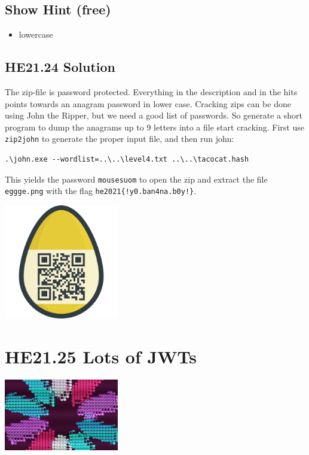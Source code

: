 \documentclass[english,a4paper,nols,noindent]{tufte-handout}
\begin{document}
\subsection{Show Hint (free)}
\begin{itemize}
\item lowercase
\end{itemize}

\hypertarget{he21.24-solution}{%
\subsection{HE21.24 Solution}\label{he21.24-solution}}

\noindent The zip-file is password protected.  Everything in the description
and in the hits points towards an anagram password in lower case.  Cracking
zips can be done using John the Ripper, but we need a good list of passwords.
So generate a short program to dump the anagrams up to 9 letters into a file
start cracking.  First use \verb+zip2john+ to generate the proper input file,
and then run john:

\begin{verbatim} 
.\john.exe --wordlist=..\..\level4.txt ..\..\tacocat.hash
\end{verbatim}

This yields the password \verb+mousesuom+ to open the zip and extract the file
\verb+eggge.png+ with the flag \verb+he2021{!y0.ban4na.b0y!}+.

\begin{marginfigure}
    \includegraphics[width=50mm]{ch24/eggge.png}
\end{marginfigure}

\hypertarget{he21.25}{%
  \section{HE21.25 Lots of JWTs}
  \label{he21.25}}
\begin{marginfigure}
    \includegraphics[width=50mm]{images/challenge25.jpg}
\end{marginfigure}
\end{document}
